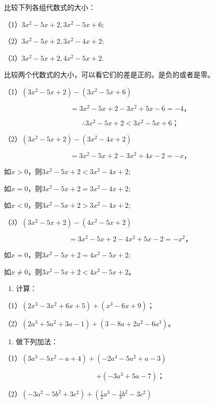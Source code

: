  比较下列各组代数式的大小：

（1）\(3x^{2} - 5x + 2, 3x^{2} - 5x + 6;\)

（2）\(3x^{2} - 5x + 2, 3x^{2} - 4x + 2;\)

（3）\(3x^{2} - 5x + 2, 4x^{2} - 5x + 2.\)

比较两个代数式的大小，可以看它们的差是正的。是负的或者是零。

 （1）\((3x^{2} - 5x + 2) - (3x^{2} - 5x + 6)\)

\[
= 3 x ^{2} - 5 x + 2 - 3 x ^{2} + 5 x - 6 = - 4\text{，}
\]

\[
\therefore 3 x ^{2} - 5 x + 2 < 3 x ^{2} - 5 x + 6\text{；}
\]

（2）\((3x^{2} - 5x + 2) - (3x^{2} - 4x + 2)\)

\[
= 3 x ^{2} - 5 x + 2 - 3 x ^{2} + 4 x - 2 = - x\text{，}
\]

如\(x > 0\)，则\(3x^{2} - 5x + 2 < 3x^{2} - 4x + 2;\)

如\(x = 0\)，则\(3x^{2} - 5x + 2 = 3x^{2} - 4x + 2;\)

如\(x < 0\)，则\(3x^{2} - 5x + 2 > 3x^{2} - 4x + 2;\)

（3）\((3x^{2} - 5x + 2) - (4x^{2} - 5x + 2)\)

\[
= 3 x ^{2} - 5 x + 2 - 4 x ^{2} + 5 x - 2 = - x ^{2}\text{，}
\]

如\(x = 0\)，则\(3x^{2} - 5x + 2 = 4x^{2} - 5x + 2;\)

如\(x \neq 0\)，则\(3x^{2} - 5x + 2 < 4x^{2} - 5x + 2\)。

\begin{enumerate}
\item
  计算：
\end{enumerate}

（1）\((2x^{3} - 3x^{2} + 6x + 5) + (x^{3} - 6x + 9)\)；

（2）\((2a^{3} + 5a^{2} + 3a - 1) + (3 - 8a + 2a^{2} - 6a^{3})\)。

\begin{enumerate}[start=2]
\item
  做下列加法：
\end{enumerate}

（1）\((3a^{3} - 5x^{2} - a + 4) + (-2a^{4} - 5a^{2} + a - 3)\)

\[
+ (- 3 a ^{3} + 5 a - 7)\text{；}
\]

（2）\((-3a^{2} - 5b^{2} + 3c^{2}) + \left(\frac{1}{2} a^{3} - \frac{1}{3} b^{2} - 3c^{2}\right)\)

